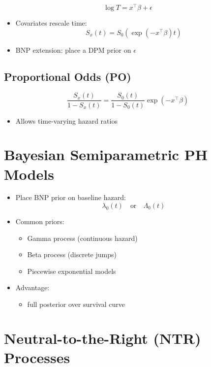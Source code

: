 \documentclass[12pt,oneside]{book}
\numberwithin{equation}{section}
\theoremstyle{definition}
\theoremstyle{plain}
\theoremstyle{remark}
\begin{document}
\[
\log T = x^\top \beta + \epsilon
\]

\begin{itemize}
\item Covariates rescale time:
\[
S_x(t) = S_0(\exp(-x^\top \beta)t)
\]
\item BNP extension: place a DPM prior on $\epsilon$
\end{itemize}

\subsection{Proportional Odds (PO)}

\[
\frac{S_x(t)}{1 - S_x(t)} =
\frac{S_0(t)}{1 - S_0(t)} \exp(-x^\top \beta)
\]

\begin{itemize}
\item Allows time-varying hazard ratios
\end{itemize}

\section{Bayesian Semiparametric PH Models}

\begin{itemize}
\item Place BNP prior on baseline hazard:
\[
\lambda_0(t) \quad \text{or} \quad \Lambda_0(t)
\]

\item Common priors:
\begin{itemize}
\item Gamma process (continuous hazard)
\item Beta process (discrete jumps)
\item Piecewise exponential models
\end{itemize}

\item Advantage:
\begin{itemize}
\item full posterior over survival curve
\end{itemize}
\end{itemize}

\section{Neutral-to-the-Right (NTR) Processes}
\end{document}

